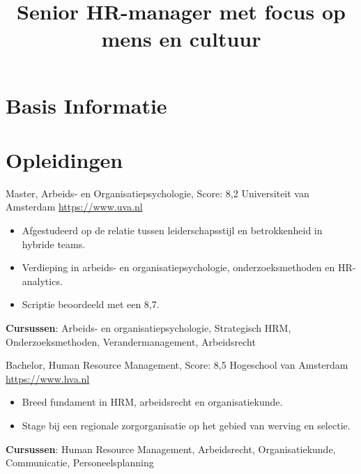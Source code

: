 \documentclass[a4paper, serif, 10pt]{moderncv}
\title{Senior HR-manager met focus op mens en cultuur}
\begin{document}
\maketitle

\section{Basis Informatie}

\section{Opleidingen}

        {Master, Arbeids- en Organisatiepsychologie, Score: 8,2}
        {Universiteit van Amsterdam}
        {\url{https://www.uva.nl}}
        {}
        {\begin{itemize}
\item Afgestudeerd op de relatie tussen leiderschapsstijl en betrokkenheid in hybride teams.
\item Verdieping in arbeids- en organisatiepsychologie, onderzoeksmethoden en HR-analytics.
\item Scriptie beoordeeld met een 8,7.
\end{itemize}
\textbf{Cursussen}: Arbeids- en organisatiepsychologie, Strategisch HRM, Onderzoeksmethoden, Verandermanagement, Arbeidsrecht}

        {Bachelor, Human Resource Management, Score: 8,5}
        {Hogeschool van Amsterdam}
        {\url{https://www.hva.nl}}
        {}
        {\begin{itemize}
\item Breed fundament in HRM, arbeidsrecht en organisatiekunde.
\item Stage bij een regionale zorgorganisatie op het gebied van werving en selectie.
\end{itemize}
\textbf{Cursussen}: Human Resource Management, Arbeidsrecht, Organisatiekunde, Communicatie, Personeelsplanning}
\end{document}

